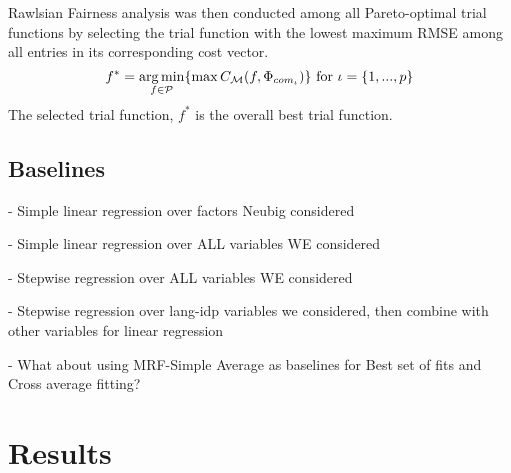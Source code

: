 \documentclass[11pt]{article}
\begin{document}
Rawlsian Fairness analysis was then conducted among all Pareto-optimal trial functions by selecting the trial function with the lowest maximum RMSE among all entries in its corresponding cost vector. 
$$
    f^{*} = \operatorname*{arg\,min}_{f \in \mathcal{P}} \{\max C_{\mathcal{M}}(f, \Phi_{com_{\iota}}) \} \text { for } \iota = \{1, ..., p\}
$$
The selected trial function, $f^*$ is the overall best trial function.

\subsection{Baselines} 
- Simple linear regression over factors Neubig considered

- Simple linear regression over ALL variables WE considered

- Stepwise regression over ALL variables WE considered

- Stepwise regression over lang-idp variables we considered, then combine with other variables for linear regression

- What about using MRF-Simple Average as baselines for Best set of fits and Cross average fitting?
\section{Results}
\end{document}
